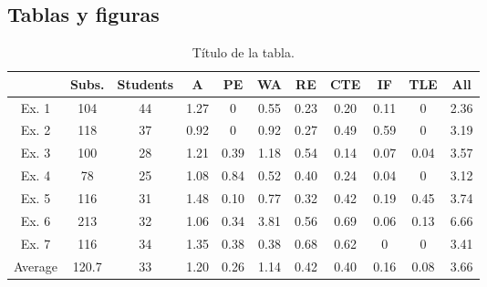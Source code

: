 \documentclass[twoside]{urjc-tfg}
\begin{document}
\subsection{Tablas y figuras}

\begin{table}
  \centering
  \caption{Título de la tabla.}
  \label{tab:una_tabla}

\begin{footnotesize}
\begin{tabular}{ccccccccccc}
  \hline
   & Subs. & Students & A & PE & WA & RE & CTE & IF & TLE & All\\
  \hline
Ex. 1 & 104 & 44 & 1.27    &   0       &   0.55    &   0.23    &   0.20    &   0.11    &   0     & 2.36  \\
Ex. 2 & 118 & 37 & 0.92    &   0       &   0.92    &   0.27    &   0.49    &   0.59    &   0     & 3.19  \\
Ex. 3 & 100 & 28 & 1.21    &   0.39    &   1.18    &   0.54    &   0.14    &   0.07    &   0.04  & 3.57  \\
Ex. 4 & 78  & 25 & 1.08    &   0.84    &   0.52    &   0.40    &   0.24    &   0.04    &   0     & 3.12  \\
Ex. 5 & 116 & 31 & 1.48    &   0.10    &   0.77    &   0.32    &   0.42    &   0.19    &   0.45  & 3.74  \\
Ex. 6 & 213 & 32 & 1.06    &   0.34    &   3.81    &   0.56    &   0.69    &   0.06    &   0.13  & 6.66  \\
Ex. 7 & 116 & 34 & 1.35    &   0.38    &   0.38    &   0.68    &   0.62    &   0       &   0     & 3.41  \\
  \hline
Average & 120.7 & 33 & 1.20 &  0.26 &  1.14 &  0.42 &  0.40 &  0.16 &  0.08 & 3.66 \\
  \hline
 \end{tabular}
\end{footnotesize}

\end{table}
\end{document}
